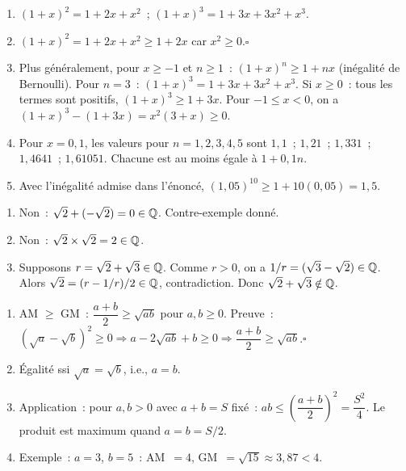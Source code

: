 
\begin{enumerate}
  \item $(1+x)^2=1+2x+x^2$~; $(1+x)^3=1+3x+3x^2+x^3$.
  \item $(1+x)^2=1+2x+x^2\geq1+2x$ car $x^2\geq0$.\hfill$\square$
  \item Plus g\'en\'eralement, pour $x\geq-1$ et $n\geq1$~:
        $(1+x)^n\geq1+nx$ (in\'egalit\'e de Bernoulli).
        Pour $n=3$~: $(1+x)^3=1+3x+3x^2+x^3$.
        Si $x\geq0$~: tous les termes sont positifs, $(1+x)^3\geq1+3x$.\checkmark
        Pour $-1\leq x<0$, on a
        $(1+x)^3-(1+3x)=x^2(3+x)\geq0$.
  \item Pour $x=0{,}1$, les valeurs pour $n=1,2,3,4,5$ sont
        $1{,}1$~; $1{,}21$~; $1{,}331$~; $1{,}4641$~; $1{,}61051$.
        Chacune est au moins \'egale \`a $1+0{,}1n$.
  \item Avec l'in\'egalit\'e admise dans l'\'enonc\'e,
        $(1{,}05)^{10}\geq1+10(0{,}05)=1{,}5$.
\end{enumerate}


\begin{enumerate}
  \item Non~: $\sqrt{2}+(-\sqrt{2})=0\in\mathbb{Q}$. Contre-exemple donn\'e.
  \item Non~: $\sqrt{2}\times\sqrt{2}=2\in\mathbb{Q}$.
  \item Supposons $r=\sqrt2+\sqrt3\in\mathbb{Q}$.
        Comme $r>0$, on a $1/r=(\sqrt3-\sqrt2)\in\mathbb{Q}$.
        Alors $\sqrt2=(r-1/r)/2\in\mathbb{Q}$, contradiction.
        Donc $\sqrt2+\sqrt3\notin\mathbb{Q}$.
\end{enumerate}


\begin{enumerate}
  \item AM $\geq$ GM~: $\dfrac{a+b}{2}\geq\sqrt{ab}$ pour $a,b\geq0$.
        Preuve~: $(\sqrt{a}-\sqrt{b})^2\geq0
        \Rightarrow a-2\sqrt{ab}+b\geq0
        \Rightarrow\dfrac{a+b}{2}\geq\sqrt{ab}$.\hfill$\square$
  \item \'Egalit\'e ssi $\sqrt{a}=\sqrt{b}$, i.e., $a=b$.
  \item Application~: pour $a,b>0$ avec $a+b=S$ fix\'e~:
        $ab\leq\left(\dfrac{a+b}{2}\right)^2=\dfrac{S^2}{4}$.
        Le produit est maximum quand $a=b=S/2$.
  \item Exemple~: $a=3$, $b=5$~: AM~$=4$, GM~$=\sqrt{15}\approx3{,}87<4$.\checkmark
\end{enumerate}


